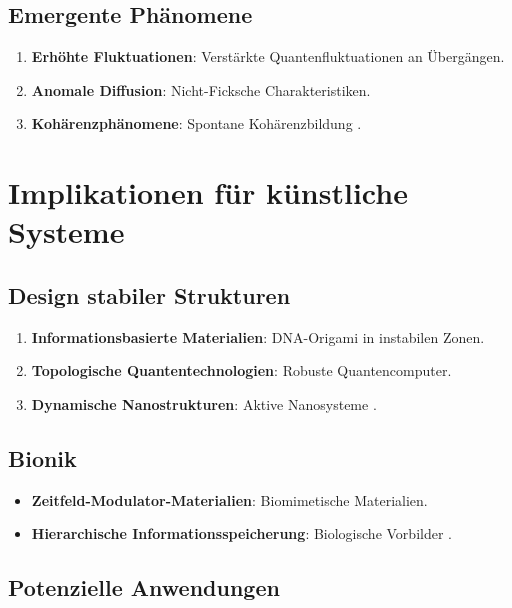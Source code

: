 \documentclass[12pt,a4paper]{article}
\begin{document}
	\subsection{Emergente Phänomene}
	
	\begin{enumerate}
		\item \textbf{Erhöhte Fluktuationen}: Verstärkte Quantenfluktuationen an Übergängen.
		\item \textbf{Anomale Diffusion}: Nicht-Ficksche Charakteristiken.
		\item \textbf{Kohärenzphänomene}: Spontane Kohärenzbildung \cite{pascher_nateinheiten_2025}.
	\end{enumerate}
	
	\section{Implikationen für künstliche Systeme}
	
	\subsection{Design stabiler Strukturen}
	
	\begin{enumerate}
		\item \textbf{Informationsbasierte Materialien}: DNA-Origami in instabilen Zonen.
		\item \textbf{Topologische Quantentechnologien}: Robuste Quantencomputer.
		\item \textbf{Dynamische Nanostrukturen}: Aktive Nanosysteme \cite{pascher_nateinheiten_2025}.
	\end{enumerate}
	
	\subsection{Bionik}
	
	\begin{itemize}
		\item \textbf{Zeitfeld-Modulator-Materialien}: Biomimetische Materialien.
		\item \textbf{Hierarchische Informationsspeicherung}: Biologische Vorbilder \cite{pascher_nateinheiten_2025}.
	\end{itemize}
	
	\subsection{Potenzielle Anwendungen}
	
\end{document}
